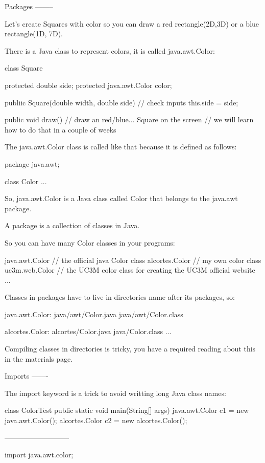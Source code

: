 \documentclass[a4paper, 9pt]{extarticle}
\begin{document}
\begin{blackboard}
Packages
--------

Let's create Squares with color so you can draw a red rectangle(2D,3D) or 
a blue rectangle(1D, 7D).

There is a Java class to represent colors, it is called java.awt.Color:

class Square {
    protected double side;
    protected java.awt.Color color;

    publiic Square(double width, double side) {
        // check inputs
        this.side = side;
    }

    public void draw() {
        // draw an red/blue... Square on the screen
        // we will learn how to do that in a couple of weeks
    }
}

The java.awt.Color class is called like that because it is defined as follows:

package java.awt;

class Color {
...
}

So, java.awt.Color is a Java class called Color that belongs to the java.awt
package.

A package is a collection of classes in Java.

So you can have many Color classes in your programs:

java.awt.Color // the official java Color class
alcortes.Color // my own color class
uc3m.web.Color // the UC3M color class for creating the UC3M official website
...

Classes in packages have to live in directories name after its packages, so:

java.awt.Color: java/awt/Color.java
                java/awt/Color.class

alcortes.Color: alcortes/Color.java
                java/Color.class
...

Compiling classes in directories is tricky, you have a required reading about
this in the materials page.



Imports
-------

The import keyword is a trick to avoid writting long Java class names:

class ColorTest {
    public static void main(String[] args) {
        java.awt.Color c1 = new java.awt.Color();
        alcortes.Color c2 = new alcortes.Color();
    }
}

---------------------------

import java.awt.color;


\end{blackboard}
\end{document}
